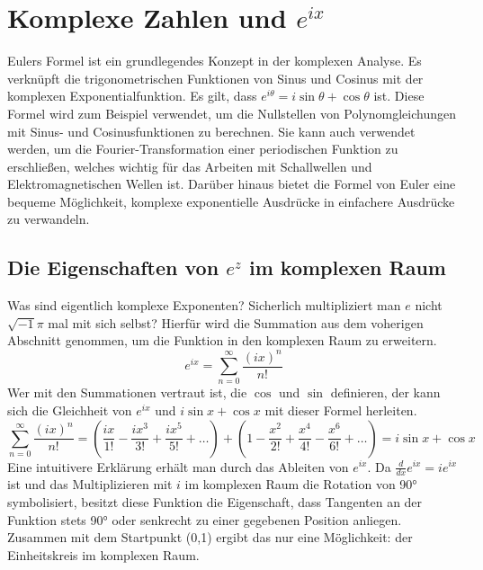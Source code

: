 \section{Komplexe Zahlen und $e^{ix}$}
Eulers Formel ist ein grundlegendes Konzept in der komplexen Analyse. Es verknüpft die trigonometrischen Funktionen von Sinus und Cosinus mit der komplexen Exponentialfunktion. Es gilt, dass $e^{i\theta} = i\sin\theta + \cos\theta$ ist.
Diese Formel wird zum Beispiel verwendet, um die Nullstellen von Polynomgleichungen mit Sinus- und Cosinusfunktionen zu berechnen. Sie kann auch verwendet werden, um die Fourier-Transformation einer periodischen Funktion zu erschließen, welches wichtig für das Arbeiten mit Schallwellen und Elektromagnetischen Wellen ist. Darüber hinaus bietet die Formel von Euler eine bequeme Möglichkeit, komplexe exponentielle Ausdrücke in einfachere Ausdrücke zu verwandeln.
\subsection{Die Eigenschaften von $e^z$ im komplexen Raum}
Was sind eigentlich komplexe Exponenten? Sicherlich multipliziert man $e$ nicht $\sqrt{-1}\pi$ mal mit sich selbst? Hierfür wird die Summation aus dem voherigen Abschnitt genommen, um die Funktion in den komplexen Raum zu erweitern. \[
  e^{ix} = \sum_{n=0}^\infty \frac{(ix)^n}{n!}
  \] Wer mit den Summationen vertraut ist, die $\cos$ und  $\sin$ definieren, der kann sich die Gleichheit von $e^{ix}$ und  $i\sin{x}+ \cos{x}$ mit dieser Formel herleiten.  \[
\sum_{n=0}^\infty \frac{(ix)^n}{n!} = (\frac{ix}{1!} - \frac{ix^3}{3!} + \frac{ix^5}{5!} + \dots) + (1 - \frac{x^2}{2!} + \frac{x^4}{4!} - \frac{x^6}{6!} + \dots) = i\sin{x} + \cos{x}
\] Eine intuitivere Erklärung erhält man durch das Ableiten von $e^{ix}$. Da  $\frac{d}{dx}e^{ix} = ie^{ix}$ ist und das Multiplizieren mit $i$ im komplexen Raum die Rotation von 90° symbolisiert, besitzt diese Funktion die Eigenschaft, dass Tangenten an der Funktion stets 90° oder senkrecht 
zu einer gegebenen Position anliegen. Zusammen mit dem Startpunkt (0,1) ergibt das nur eine Möglichkeit: der Einheitskreis im komplexen Raum.
